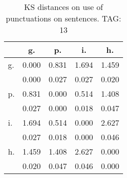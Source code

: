 \begin{table}[h!]
\begin{center}
\begin{tabular}{| l | c | c | c | c |}\hline
 & g. & p. & i. & h. \\\hline
g. & 0.000  & 0.831  & 1.694  & 1.459 \\\hline
 & 0.000  & 0.027  & 0.027  & 0.020 \\\hline
p. & 0.831  & 0.000  & 0.514  & 1.408 \\\hline
 & 0.027  & 0.000  & 0.018  & 0.047 \\\hline
i. & 1.694  & 0.514  & 0.000  & 2.627 \\\hline
 & 0.027  & 0.018  & 0.000  & 0.046 \\\hline
h. & 1.459  & 1.408  & 2.627  & 0.000 \\\hline
 & 0.020  & 0.047  & 0.046  & 0.000 \\\hline
\end{tabular}
\caption{KS distances on use of punctuations on sentences. TAG: 13}
\end{center}
\end{table}